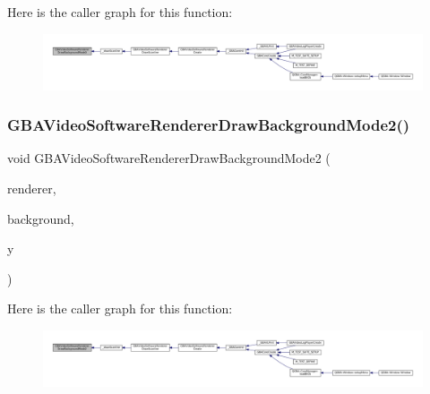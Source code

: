 Here is the caller graph for this function\+:
\nopagebreak
\begin{figure}[H]
\begin{center}
\leavevmode
\includegraphics[width=350pt]{software-private_8h_aa2ad56e185c8e2391b4fd6bbc6835e22_icgraph}
\end{center}
\end{figure}
\mbox{\label{software-private_8h_a857093ab69d7c97954123b68e1cb57ae}} 
\subsubsection{\texorpdfstring{G\+B\+A\+Video\+Software\+Renderer\+Draw\+Background\+Mode2()}{GBAVideoSoftwareRendererDrawBackgroundMode2()}}
{\footnotesize\ttfamily void G\+B\+A\+Video\+Software\+Renderer\+Draw\+Background\+Mode2 (\begin{DoxyParamCaption}\item[{struct G\+B\+A\+Video\+Software\+Renderer $\ast$}]{renderer,  }\item[{struct G\+B\+A\+Video\+Software\+Background $\ast$}]{background,  }\item[{\mbox{\hyperlink{ioapi_8h_a787fa3cf048117ba7123753c1e74fcd6}{int}}}]{y }\end{DoxyParamCaption})}

Here is the caller graph for this function\+:
\nopagebreak
\begin{figure}[H]
\begin{center}
\leavevmode
\includegraphics[width=350pt]{software-private_8h_a857093ab69d7c97954123b68e1cb57ae_icgraph}
\end{center}
\end{figure}
\mbox{\label{software-private_8h_a5f6c2be8bd7b2cede91d2b562d7c34a9}} 
